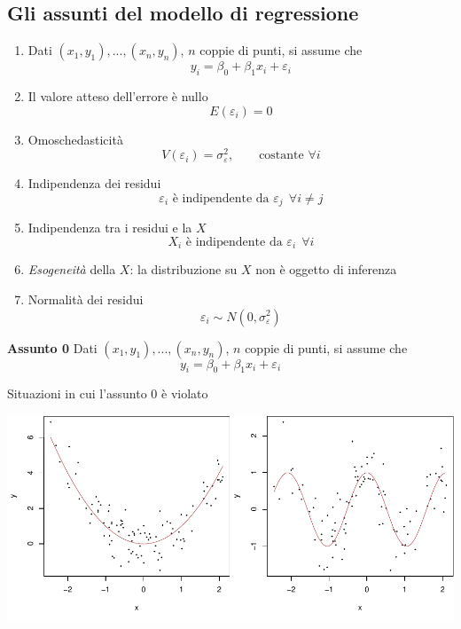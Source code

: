 \documentclass[
  11pt,
]{book}
\providecommand{\tightlist}{%
  \setlength{\itemsep}{0pt}\setlength{\parskip}{0pt}}
\theoremstyle{mytheoremstyle}
\theoremstyle{mydefstyle}
\begin{document}
\subsection{Gli assunti del modello di regressione}\label{gli-assunti-del-modello-di-regressione}

\begin{info}

\begin{enumerate}
\def\labelenumi{\arabic{enumi}.}
\setcounter{enumi}{-1}
\tightlist
\item
  Dati \((x_1,y_1),...,(x_n,y_n)\), \(n\) coppie di punti, si assume che
  \[y_i=\beta_0+\beta_1x_i+\varepsilon_i\]
\item
  Il valore atteso dell'errore è nullo
  \[E(\varepsilon_i)=0\]
\item
  Omoschedasticità
  \[V(\varepsilon_{i}) = \sigma_\varepsilon^2,\qquad \text{costante }\forall i\]
\item
  Indipendenza dei residui
  \[\varepsilon_i\text{ è indipendente da }\varepsilon_j~~\forall i\neq j\]
\item
  Indipendenza tra i residui e la \(X\)
  \[X_i\text{ è indipendente da }\varepsilon_i~~\forall i\]
\item
  \emph{Esogeneità} della \(X\): la distribuzione su \(X\) non è oggetto di inferenza
\item
  Normalità dei residui
  \[\varepsilon_i\sim N(0,\sigma^2_\varepsilon)\]
\end{enumerate}

\end{info}

\textbf{Assunto 0}
Dati \((x_1,y_1),...,(x_n,y_n)\), \(n\) coppie di punti, si assume che
\[y_i=\beta_0+\beta_1x_i+\varepsilon_i\]

Situazioni in cui l'assunto 0 è violato

\begin{center}\includegraphics{Appunti_di_Statistica_2025_files/figure-latex/17-regressione-I-20-1} \end{center}
\end{document}

